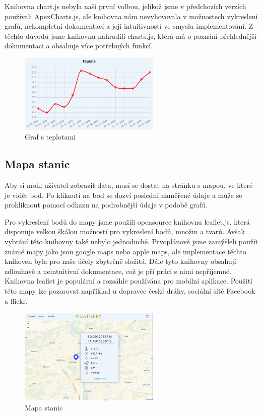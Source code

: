 Knihovna chart.js nebyla naší první volbou, jelikož jsme v předchozích verzích používali ApexCharts.js, ale knihovna nám nevyhovovala v možnostech vykreslení grafů, nekompletní dokumentací a její intuitivností ve smyslu implementování.
Z těchto důvodů jsme knihovnu nahradili charts.js, která má o poznání přehlednější dokumentaci a obsahuje více potřebných funkcí.

\begin{figure}[h] %
    \centering
    \includegraphics[width=0.6\textwidth]{images/graf.png}
    \caption{Graf s teplotami}
    \label{ukazka_grafu}
\end{figure}

\subsection{Mapa stanic}
Aby si mohl uživatel zobrazit data, musí se dostat na stránku s mapou, ve které je vidět bod. Po kliknutí na bod se dozví poslední naměřené údaje a může se prokliknout pomocí odkazu na podrobnější údaje v podobě grafů.

Pro vykreslení bodů do mapy jsme použili opensource knihovnu leaflet.js, která disponuje velkou škálou možností pro vykreslení bodů, množin a tvarů.
Avšak vybrání této knihovny také nebylo jednoduché. Prvoplánově jsme zamýšleli použít známé mapy jako jsou google maps nebo apple maps, ale implementace těchto knihoven byla pro naše účely zbytečně složitá. Dále tyto knihovny obsahují zdlouhavě a neintuitivní dokumentace, což je při práci s nimi nepříjemné.
Knihovna leaflet je populární a rozsáhle používána pro mobilní aplikace. Použití této mapy lze pozorovat například u dopravce české dráhy, sociální sítě Facebook a flickr.

\begin{figure}[h] %
    \centering
    \includegraphics[width=0.6\textwidth]{images/mapa.png}
    \caption{Mapa stanic}
    \label{mapa}
\end{figure}


